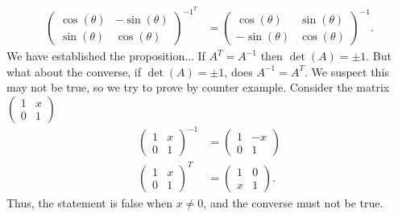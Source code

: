\documentclass{report}
\begin{document}
\begin{itemize}
\begin{align*}
                \begin{pmatrix} \cos{\left(\theta \right)} & -\sin{\left(\theta \right)} \\ \sin{\left(\theta \right)} & \cos{\left(\theta \right)}\end{pmatrix}^{-1}^{T} &= \begin{pmatrix} \cos{\left(\theta \right)} & \sin{\left(\theta \right)} \\ -\sin{\left(\theta \right)} & \cos{\left(\theta \right)}\end{pmatrix}^{-1}
            .\end{align*}
            \bigbreak \noindent 
            We have established the proposition... If $A^{T} = A^{-1}$ then $\det(A) = \pm 1$. But what about the converse, if $\det(A) = \pm 1$, does $A^{-1} = A^{T}$. We suspect this may not be true, so we try to prove by counter example. Consider the matrix $\begin{pmatrix} 1 & x \\ 0 & 1 \end{pmatrix}$
            \begin{align*}
                \begin{pmatrix} 1 & x \\ 0 & 1 \end{pmatrix}^{-1} &= \begin{pmatrix} 1 & -x \\ 0 & 1\end{pmatrix} \\
                \begin{pmatrix} 1 & x \\ 0 & 1 \end{pmatrix}^{T} &= \begin{pmatrix} 1 & 0 \\ x & 1\end{pmatrix}
            .\end{align*}
            Thus, the statement is false when $x\ne 0$, and the converse must not be true.


\end{itemize}
\end{document}
